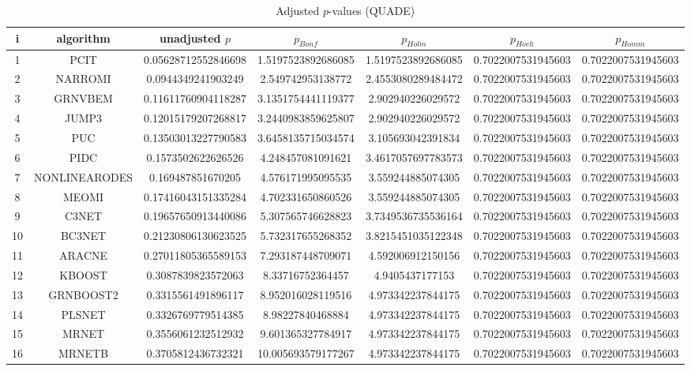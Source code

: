\documentclass[a4paper,10pt]{article}
\begin{document}
\begin{landscape}
\begin{table}[!htp]
\centering\scriptsize
\caption{Adjusted $p$-values (QUADE)}
\begin{tabular}{ccccccc}
i&algorithm&unadjusted $p$&$p_{Bonf}$&$p_{Holm}$&$p_{Hoch}$&$p_{Homm}$\\
\hline
1&PCIT&0.05628712552846698&1.5197523892686085&1.5197523892686085&0.7022007531945603&0.7022007531945603\\
2&NARROMI&0.0944349241903249&2.549742953138772&2.4553080289484472&0.7022007531945603&0.7022007531945603\\
3&GRNVBEM&0.11611760904118287&3.1351754441119377&2.902940226029572&0.7022007531945603&0.7022007531945603\\
4&JUMP3&0.12015179207268817&3.2440983859625807&2.902940226029572&0.7022007531945603&0.7022007531945603\\
5&PUC&0.13503013227790583&3.6458135715034574&3.105693042391834&0.7022007531945603&0.7022007531945603\\
6&PIDC&0.1573502622626526&4.248457081091621&3.4617057697783573&0.7022007531945603&0.7022007531945603\\
7&NONLINEARODES&0.169487851670205&4.576171995095535&3.559244885074305&0.7022007531945603&0.7022007531945603\\
8&MEOMI&0.17416043151335284&4.702331650860526&3.559244885074305&0.7022007531945603&0.7022007531945603\\
9&C3NET&0.19657650913440086&5.307565746628823&3.7349536735536164&0.7022007531945603&0.7022007531945603\\
10&BC3NET&0.21230806130623525&5.732317655268352&3.8215451035122348&0.7022007531945603&0.7022007531945603\\
11&ARACNE&0.27011805365589153&7.293187448709071&4.592006912150156&0.7022007531945603&0.7022007531945603\\
12&KBOOST&0.3087839823572063&8.33716752364457&4.9405437177153&0.7022007531945603&0.7022007531945603\\
13&GRNBOOST2&0.3315561491896117&8.952016028119516&4.973342237844175&0.7022007531945603&0.7022007531945603\\
14&PLSNET&0.3326769779514385&8.98227840468884&4.973342237844175&0.7022007531945603&0.7022007531945603\\
15&MRNET&0.3556061232512932&9.601365327784917&4.973342237844175&0.7022007531945603&0.7022007531945603\\
16&MRNETB&0.3705812436732321&10.005693579177267&4.973342237844175&0.7022007531945603&0.7022007531945603\\

\end{tabular}
\end{table}
\end{landscape}
\end{document}
